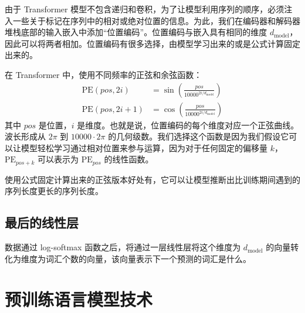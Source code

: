 由于 Transformer 模型不包含递归和卷积，为了让模型利用序列的顺序，必须注入一些关于标记在序列中的相对或绝对位置的信息。为此，我们在编码器和解码器堆栈底部的输入嵌入中添加“位置编码”。位置编码与嵌入具有相同的维度 $d_{\text{model}}$，因此可以将两者相加。位置编码有很多选择，由模型学习出来的或是公式计算固定出来的。

在 Transformer 中，使用不同频率的正弦和余弦函数：
\begin{equation}
\begin{aligned}
\text{PE}(pos,2i) &= \sin \left ( \frac{pos}{10000^{2i/d_{\text{model}}}} \right ) \\
\text{PE}(pos,2i+1) &= \cos \left ( \frac{pos}{10000^{2i/d_{\text{model}}}} \right )
\end{aligned}
\label{eq3.5}
\end{equation}
其中 $pos$ 是位置，$i$ 是维度。也就是说，位置编码的每个维度对应一个正弦曲线。波长形成从 $2\pi$ 到 $10000 \cdot 2\pi$ 的几何级数。我们选择这个函数是因为我们假设它可以让模型轻松学习通过相对位置来参与运算，因为对于任何固定的偏移量 $k$，$\text{PE}_{pos+k}$ 可以表示为 $\text{PE}_{pos}$ 的线性函数。

使用公式固定计算出来的正弦版本好处有，它可以让模型推断出比训练期间遇到的序列长度更长的序列长度。

\subsection{最后的线性层}
数据通过 log-softmax 函数之后，将通过一层线性层将这个维度为 $d_{\text{model}}$ 的向量转化为维度为词汇个数的向量，该向量表示下一个预测的词汇是什么。

\section{预训练语言模型技术}

